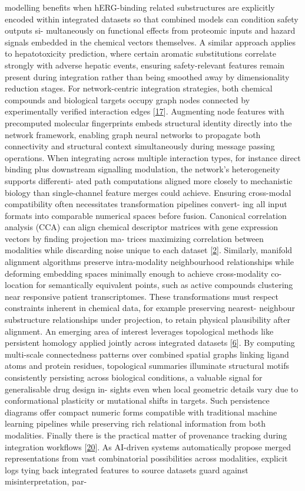 \documentclass[
]{article}
\begin{document}
modelling benefits when hERG-binding related substructures are
explicitly encoded within integrated datasets so that combined models
can condition safety outputs si- multaneously on functional effects from
proteomic inputs and hazard signals embedded in the chemical vectors
themselves. A similar approach applies to hepatotoxicity prediction,
where certain aromatic substitutions correlate strongly with adverse
hepatic events, ensuring safety-relevant features remain present during
integration rather than being smoothed away by dimensionality reduction
stages. For network-centric integration strategies, both chemical
compounds and biological targets occupy graph nodes connected by
experimentally verified interaction edges
{[}\protect\hyperlink{_bookmark57}{17}{]}. Augmenting node features with
precomputed molecular fingerprints embeds structural identity directly
into the network framework, enabling graph neural networks to propagate
both connectivity and structural context simultaneously during message
passing operations. When integrating across multiple interaction types,
for instance direct binding plus downstream signalling modulation, the
network's heterogeneity supports differenti- ated path computations
aligned more closely to mechanistic biology than single-channel feature
merges could achieve. Ensuring cross-modal compatibility often
necessitates transformation pipelines convert- ing all input formats
into comparable numerical spaces before fusion. Canonical correlation
analysis (CCA) can align chemical descriptor matrices with gene
expression vectors by finding projection ma- trices maximizing
correlation between modalities while discarding noise unique to each
dataset {[}\protect\hyperlink{_bookmark42}{2}{]}. Similarly, manifold
alignment algorithms preserve intra-modality neighbourhood relationships
while deforming embedding spaces minimally enough to achieve
cross-modality co-location for semantically equivalent points, such as
active compounds clustering near responsive patient transcriptomes.
These transformations must respect constraints inherent in chemical
data, for example preserving nearest- neighbour substructure
relationships under projection, to retain physical plausibility after
alignment. An emerging area of interest leverages topological methods
like persistent homology applied jointly across integrated datasets
{[}\protect\hyperlink{_bookmark46}{6}{]}. By computing multi-scale
connectedness patterns over combined spatial graphs linking ligand atoms
and protein residues, topological summaries illuminate structural motifs
consistently persisting across biological conditions, a valuable signal
for generalisable drug design in- sights even when local geometric
details vary due to conformational plasticity or mutational shifts in
targets. Such persistence diagrams offer compact numeric forms
compatible with traditional machine learning pipelines while preserving
rich relational information from both modalities. Finally there is the
practical matter of provenance tracking during integration workflows
{[}\protect\hyperlink{_bookmark60}{20}{]}. As AI-driven systems
automatically propose merged representations from vast combinatorial
possibilities across modalities, explicit logs tying back integrated
features to source datasets guard against misinterpretation, par-
\end{document}
